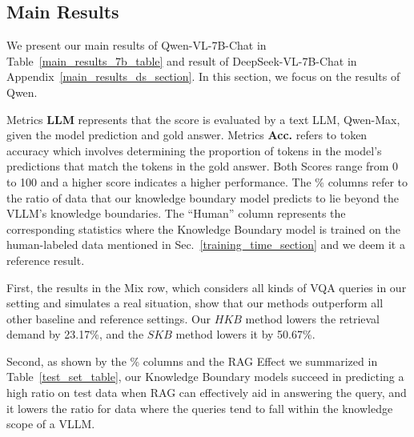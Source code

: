 \subsection{Main Results}
\label{main_result}


We present our main results of Qwen-VL-7B-Chat in Table~\ref{main_results_7b_table} and result of DeepSeek-VL-7B-Chat in Appendix~\ref{main_results_ds_section}. In this section, we focus on the results of Qwen. 


Metrics \textbf{LLM} represents that the score is evaluated by a text LLM, Qwen-Max, given the model prediction and gold answer. Metrics \textbf{Acc.} refers to token accuracy which involves determining the proportion of tokens in the model's predictions that match the tokens in the gold answer. Both Scores range from 0 to 100 and a higher score indicates a higher performance. The \% columns refer to the ratio of data that our knowledge boundary model predicts to lie beyond the VLLM's knowledge boundaries. The ``Human'' column represents the corresponding statistics where the Knowledge Boundary model is trained on the human-labeled data mentioned in Sec.~\ref{training_time_section} and we deem it a reference result. 

First, the results in the Mix row, which considers all kinds of VQA queries in our setting and simulates a real situation, show that our methods outperform all other baseline and reference settings. Our $HKB$ method lowers the retrieval demand by 23.17\%, and the $SKB$ method lowers it by 50.67\%.

Second, as shown by the \% columns and the RAG Effect we summarized in Table~\ref{test_set_table}, our Knowledge Boundary models succeed in predicting a high ratio on test data when RAG can effectively aid in answering the query, and it lowers the ratio for data where the queries tend to fall within the knowledge scope of a VLLM. 


